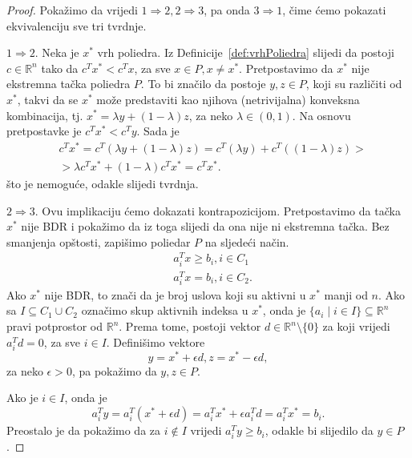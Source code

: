 \documentclass[a4paper, utf8, 11pt, colorlinks]{book}
\theoremstyle{definition}
\begin{document}
\begin{proof}
      Pokažimo da vrijedi $1 \Rightarrow 2, 2 \Rightarrow 3$, pa onda $3 \Rightarrow 1$, čime ćemo pokazati ekvivalenciju sve tri tvrdnje.
      
      $1 \Rightarrow 2$. Neka je $x^*$ vrh poliedra. Iz Definicije~\ref{def:vrhPoliedra} slijedi da 
      postoji $c\in \mathbb{R}^n$ tako da $c^Tx^* < c^T x$, za sve $x \in P, x \neq x^*$. Pretpostavimo da $x^*$ nije ekstremna tačka poliedra $P$. 
      To bi značilo da postoje $y,z \in P$, koji su različiti od $x^*$, takvi da se $x^*$ može predstaviti kao njihova (netrivijalna) konveksna kombinacija, tj. $x^* = \lambda y + (1 - \lambda) z $, za neko $\lambda \in (0,1 )$. Na osnovu pretpostavke je $c^T x^* < c^T y$.  Sada je 
      \begin{align}
          &c^T x^* = c^T ( \lambda y + (1 - \lambda) z )  = c^T( \lambda y) + c^T((1- \lambda) z) > \nonumber \\
          &>\lambda c^T x^* + ( 1 - \lambda) c^T x^* = c^T x^*.
      \end{align}
      što je nemoguće, odakle slijedi tvrdnja. 
      
      $2 \Rightarrow 3$.
       Ovu implikaciju ćemo dokazati kontrapozicijom. Pretpostavimo da tačka $x^*$ nije BDR i pokažimo da iz toga slijedi da ona nije ni ekstremna tačka.
      Bez smanjenja opštosti, zapišimo poliedar $P$ na sljedeći način.
       \begin{align}
            & a_i^T x \geq b_i, i \in C_1 \\
            & a_i^T x  = b_i, i \in C_2.
       \end{align}
       Ako $x^*$ nije BDR, to znači da je broj uslova koji su aktivni u $x^*$ manji od $n$. 
       Ako sa $I \subseteq C_1 \cup C_2$ označimo skup aktivnih indeksa u $x^*$, onda 
       je $\{ a_i \mid i \in I \} \subseteq \mathbb{R}^n$ pravi potprostor od $\mathbb{R}^n$.  Prema tome, postoji vektor $d \in \mathbb{R}^n \setminus \{0\}$ za koji vrijedi $a_i^T d = 0$, za sve $i \in I$. Definišimo vektore 
       $$ y = x^* + \epsilon d, z = x^* - \epsilon d, $$
       za neko $\epsilon > 0$, pa pokažimo da $y, z \in P$.
       
       Ako je $i \in I$, onda je $$a_i^T y = a_i^T (x^* + \epsilon d) = a_i^T x^* + \epsilon a_i^T d = a_i^T x^* = b_i. $$ Preostalo je da pokažimo da za $i \not \in I$ vrijedi $a_i^T y \geq b_i$, odakle bi slijedilo da $y \in P$. 
       

\end{proof}
\end{document}
